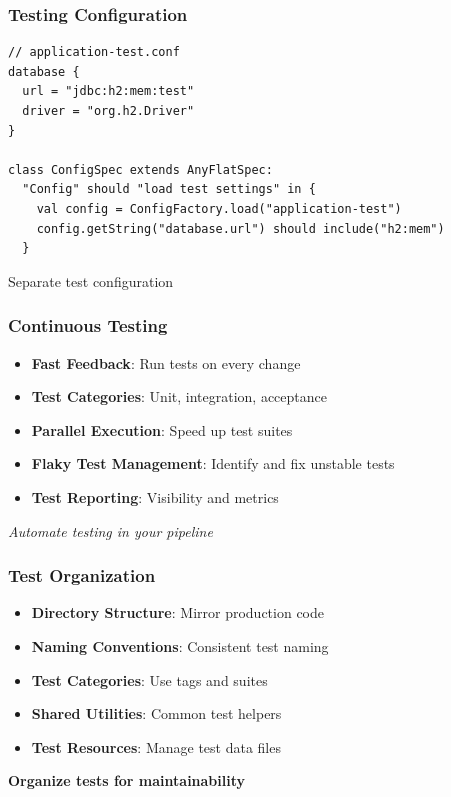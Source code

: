 \documentclass{beamer}
\begin{document}
\begin{frame}[fragile]
\frametitle{Testing Configuration}

\begin{lstlisting}[style=scalaStyle]
// application-test.conf
database {
  url = "jdbc:h2:mem:test"
  driver = "org.h2.Driver"
}

class ConfigSpec extends AnyFlatSpec:
  "Config" should "load test settings" in {
    val config = ConfigFactory.load("application-test")
    config.getString("database.url") should include("h2:mem")
  }
\end{lstlisting}

Separate test configuration

\end{frame}

\begin{frame}
\frametitle{Continuous Testing}

\begin{itemize}
  \item \textbf{Fast Feedback}: Run tests on every change
  \item \textbf{Test Categories}: Unit, integration, acceptance
  \item \textbf{Parallel Execution}: Speed up test suites
  \item \textbf{Flaky Test Management}: Identify and fix unstable tests
  \item \textbf{Test Reporting}: Visibility and metrics
\end{itemize}

\vspace{0.3cm}
\textit{Automate testing in your pipeline}

\end{frame}

\begin{frame}
\frametitle{Test Organization}

\begin{itemize}
  \item \textbf{Directory Structure}: Mirror production code
  \item \textbf{Naming Conventions}: Consistent test naming
  \item \textbf{Test Categories}: Use tags and suites
  \item \textbf{Shared Utilities}: Common test helpers
  \item \textbf{Test Resources}: Manage test data files
\end{itemize}

\vspace{0.3cm}
\textbf{Organize tests for maintainability}

\end{frame}
\end{document}
